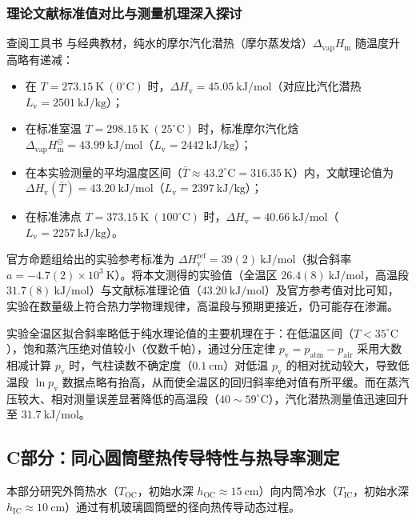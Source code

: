 \documentclass[10pt, a4paper]{ctexart}
\begin{document}
\subsubsection{理论文献标准值对比与测量机理深入探讨}
查阅工具书\cite{ref14} 与经典教材\cite{ref15}，纯水的摩尔汽化潜热（摩尔蒸发焓）$\Delta_{\mathrm{vap}} H_{\mathrm{m}}$ 随温度升高略有递减：
\begin{itemize}
\item 在 $T = 273.15\ \mathrm{K}\ (0^\circ\mathrm{C})$ 时，$\Delta H_{\mathrm{v}} = 45.05\ \mathrm{kJ/mol}$（对应比汽化潜热 $L_{\mathrm{v}} = 2501\ \mathrm{kJ/kg}$）；
\item 在标准室温 $T = 298.15\ \mathrm{K}\ (25^\circ\mathrm{C})$ 时，标准摩尔汽化焓 $\Delta_{\mathrm{vap}} H_{\mathrm{m}}^\ominus = 43.99\ \mathrm{kJ/mol}$（$L_{\mathrm{v}} = 2442\ \mathrm{kJ/kg}$）；
\item 在本实验测量的平均温度区间（$\bar{T} \approx 43.2^\circ\mathrm{C} = 316.35\ \mathrm{K}$）内，文献理论值为 $\Delta H_{\mathrm{v}}(\bar{T}) = 43.20\ \mathrm{kJ/mol}$（$L_{\mathrm{v}} = 2397\ \mathrm{kJ/kg}$）；
\item 在标准沸点 $T = 373.15\ \mathrm{K}\ (100^\circ\mathrm{C})$ 时，$\Delta H_{\mathrm{v}} = 40.66\ \mathrm{kJ/mol}$（$L_{\mathrm{v}} = 2257\ \mathrm{kJ/kg}$）。
\end{itemize}
官方命题组给出的实验参考标准为 $\Delta H_{\mathrm{v}}^{\mathrm{ref}} = 39(2)\ \mathrm{kJ/mol}$（拟合斜率 $a = -4.7(2)\times 10^3\ \mathrm{K}$）。将本文测得的实验值（全温区 $26.4(8)\ \mathrm{kJ/mol}$，高温段 $31.7(8)\ \mathrm{kJ/mol}$）与文献标准理论值（$43.20\ \mathrm{kJ/mol}$）及官方参考值对比可知，实验在数量级上符合热力学物理规律，高温段与预期更接近，仍可能存在渗漏。

实验全温区拟合斜率略低于纯水理论值的主要机理在于：在低温区间（$T < 35^\circ\mathrm{C}$），饱和蒸汽压绝对值较小（仅数千帕），通过分压定律 $p_{\mathrm{v}} = p_{\mathrm{atm}} - p_{\mathrm{air}}$ 采用大数相减计算 $p_{\mathrm{v}}$ 时，气柱读数不确定度（$0.1\ \mathrm{cm}$）对低温 $p_{\mathrm{v}}$ 的相对扰动较大，导致低温段 $\ln p_{\mathrm{v}}$ 数据点略有抬高，从而使全温区的回归斜率绝对值有所平缓。而在蒸汽压较大、相对测量误差显著降低的高温段（$40\sim 59^\circ\mathrm{C}$），汽化潜热测量值迅速回升至 $31.7\ \mathrm{kJ/mol}$。

\subsection{C部分：同心圆筒壁热传导特性与热导率测定}
本部分研究外筒热水（$T_{\mathrm{OC}}$，初始水深 $h_{\mathrm{OC}} \approx 15\ \mathrm{cm}$）向内筒冷水（$T_{\mathrm{IC}}$，初始水深 $h_{\mathrm{IC}} \approx 10\ \mathrm{cm}$）通过有机玻璃圆筒壁的径向热传导动态过程。
\end{document}
